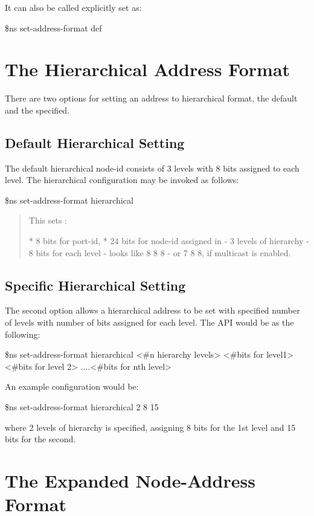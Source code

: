 It can also be called explicitly set as:
\begin{program}
\$ns set-address-format def
\end{program}


\section{The Hierarchical Address Format}
\label{sec:hierFormat}

There are two options for setting an address to hierarchical format, the
default and the specified.

\subsection{Default Hierarchical Setting}
\label{sec:def-hier}
The default hierarchical node-id consists of 3 levels with 8 bits
assigned to each level. The hierarchical configuration may be invoked as
follows: 

\$ns set-address-format hierarchical

\begin{quote}
This sets :

* 8 bits for port-id, 
* 24 bits for node-id assigned in 
  - 3 levels of hierarchy 
  - 8 bits for each level 
  - looks like 8 8 8
  - or 7 8 8, if multicast is enabled. 
\end{quote}

\subsection{Specific Hierarchical Setting}
\label{sec:sp-hier}
The second option allows a hierarchical address to be set with specified
number of levels with number of bits assigned for each level. The API
would be as the following:

\$ns set-address-format hierarchical <\#n hierarchy levels> <\#bits for
level1> <\#bits for level 2> ....<\#bits for nth level> 


An example configuration would be:

\$ns set-address-format hierarchical 2 8 15 

where 2 levels of hierarchy is specified, assigning 8 bits for the 1st
level and 15 bits for the second.


\section{The Expanded Node-Address Format}
\label{sec:expandFormat}

